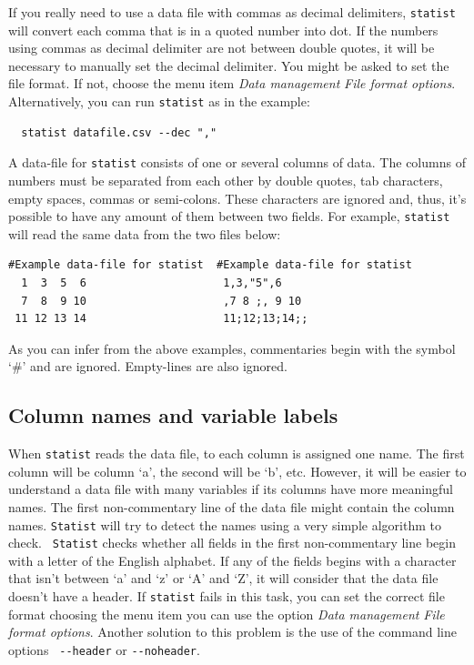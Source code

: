 \documentclass[12pt,english]{article}
\newcommand{\st}{{\tt sta\-tist} }
\begin{document}
If you really need to use a data file with commas as decimal
delimiters, \st will convert each comma that is in a quoted
number into dot. If the numbers using commas as decimal
delimiter are not between double quotes, it will be
necessary to manually set the decimal delimiter.  You might
be asked to set the file format. If not, choose the menu
item {\em Data management} {\textbar} {\em File format
options}. Alternatively, you can run \st as in the example:

\begin{verbatim}
  statist datafile.csv --dec ","
\end{verbatim}

A data-file for \st consists of one or several columns of
data.  The columns of numbers must be separated from each
other by double quotes, tab characters, empty spaces, commas
or semi-colons. These characters are ignored and, thus, it's
possible to have any amount of them between two fields. For
example, \st will read the same data from the two files
below:

\begin{verbatim}
#Example data-file for statist  #Example data-file for statist
  1  3  5  6                     1,3,"5",6
  7  8  9 10                     ,7 8 ;, 9 10
 11 12 13 14                     11;12;13;14;;
\end{verbatim}

As you can infer from the above examples, commentaries begin
with the symbol `\#' and are ignored. Empty-lines are also
ignored. 

\subsection{Column names and variable labels}

When \st reads the data file, to each column is assigned one
name. The first column will be column `a', the second will
be `b', etc. However, it will be easier to understand a data
file with many variables if its columns have more meaningful
names. The first non-commentary line of the data file might
contain the column names. {\tt Statist} will try to detect
the names using a very simple algorithm to check. {\tt
Statist} checks whether all fields in the first
non-commentary line begin with a letter of the English
alphabet. If any of the fields begins with a character that
isn't between `a' and `z' or `A' and `Z', it will consider
that the data file doesn't have a header.  If \st fails in
this task, you can set the correct file format choosing the
menu item you can use the option {\em Data management}
{\textbar} {\em File format options}.  Another solution to
this problem is the use of the command line options {\tt
{-}-header} or {\tt {-}-noheader}.
\end{document}
